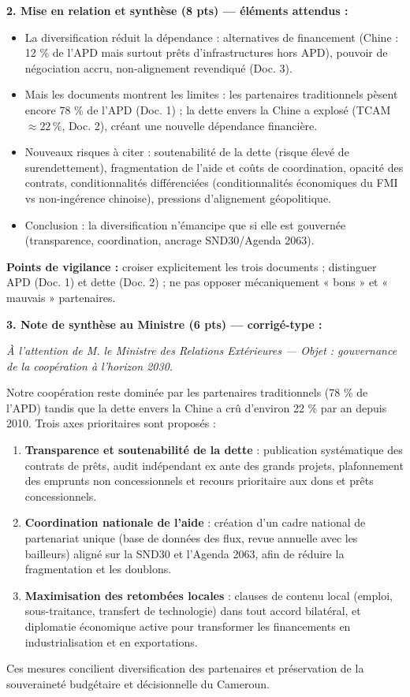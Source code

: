 \documentclass[11pt]{article}
\begin{document}
\begin{corrige}
\textbf{2. Mise en relation et synthèse (8 pts) — éléments attendus :}
\begin{itemize}
    \item La diversification réduit la dépendance : alternatives de financement (Chine : 12 \% de l'APD mais surtout prêts d'infrastructures hors APD), pouvoir de négociation accru, non-alignement revendiqué (Doc. 3).
    \item Mais les documents montrent les limites : les partenaires traditionnels pèsent encore 78 \% de l'APD (Doc. 1) ; la dette envers la Chine a explosé (TCAM $\approx 22\,\%$, Doc. 2), créant une nouvelle dépendance financière.
    \item Nouveaux risques à citer : soutenabilité de la dette (risque élevé de surendettement), fragmentation de l'aide et coûts de coordination, opacité des contrats, conditionnalités différenciées (conditionnalités économiques du FMI vs non-ingérence chinoise), pressions d'alignement géopolitique.
    \item Conclusion : la diversification n'émancipe que si elle est gouvernée (transparence, coordination, ancrage SND30/Agenda 2063).
\end{itemize}
\textbf{Points de vigilance :} croiser explicitement les trois documents ; distinguer APD (Doc. 1) et dette (Doc. 2) ; ne pas opposer mécaniquement « bons » et « mauvais » partenaires.

\textbf{3. Note de synthèse au Ministre (6 pts) — corrigé-type :}

\emph{À l'attention de M. le Ministre des Relations Extérieures — Objet : gouvernance de la coopération à l'horizon 2030.}

Notre coopération reste dominée par les partenaires traditionnels (78 \% de l'APD) tandis que la dette envers la Chine a crû d'environ 22 \% par an depuis 2010. Trois axes prioritaires sont proposés :
\begin{enumerate}
    \item \textbf{Transparence et soutenabilité de la dette} : publication systématique des contrats de prêts, audit indépendant ex ante des grands projets, plafonnement des emprunts non concessionnels et recours prioritaire aux dons et prêts concessionnels.
    \item \textbf{Coordination nationale de l'aide} : création d'un cadre national de partenariat unique (base de données des flux, revue annuelle avec les bailleurs) aligné sur la SND30 et l'Agenda 2063, afin de réduire la fragmentation et les doublons.
    \item \textbf{Maximisation des retombées locales} : clauses de contenu local (emploi, sous-traitance, transfert de technologie) dans tout accord bilatéral, et diplomatie économique active pour transformer les financements en industrialisation et en exportations.
\end{enumerate}
Ces mesures concilient diversification des partenaires et préservation de la souveraineté budgétaire et décisionnelle du Cameroun.


\end{corrige}
\end{document}
